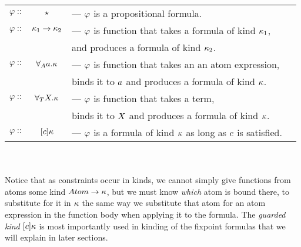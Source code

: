 \documentclass[english, mgr]{iithesis}
\begin{document}
\begin{tabular}{rclr}
$\varphi ::$ & $\star$ & ---  $\varphi$ is a propositional formula. \\
$\varphi ::$ & $\kappa_1 \to \kappa_2$ & ---  $\varphi$ is function that takes a formula of kind $\kappa_1$, \\
  & &  and produces a formula of kind $\kappa_2$. \\
$\varphi ::$ & $\forall_A a . \kappa$ & ---  $\varphi$ is function that takes an an atom expression, \\
  & &  binds it to $a$ and produces a formula of kind $\kappa$.\\
$\varphi ::$ & $\forall_T X . \kappa$ & ---  $\varphi$ is function that takes a term, \\
  & &  binds it to $X$ and produces a formula of kind $\kappa$.\\
$\varphi ::$ & $[c] \kappa$ & ---  $\varphi$ is a formula of kind $\kappa$ as long as $c$ is satisfied.
\end{tabular}
\\ \\
Notice that as constraints occur in kinds, we cannot simply give functions
from atoms some kind ${Atom}\to\kappa$, but we must know \textit{which} atom
is bound there, to substitute for it in $\kappa$ the same way we substitute
that atom for an atom expression in the function body when applying it to the formula.
The \textit{guarded kind} $[c] \kappa$ is most importantly used in
kinding of the fixpoint formulas that we will explain in later sections.
\end{document}
